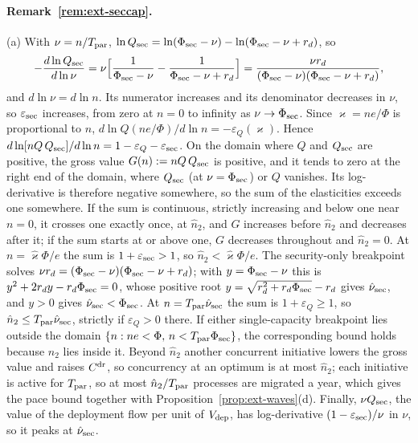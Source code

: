 \paragraph{Remark~\ref{rem:ext-seccap}.} (a) With $\nu=n/T_{\rm par}$, $\ln Q_{\rm sec}=\ln(\Phi_{\rm sec}-\nu)-\ln(\Phi_{\rm sec}-\nu+r_d)$, so
\[
-\frac{d\ln Q_{\rm sec}}{d\ln\nu}=\nu\Bigl[\frac1{\Phi_{\rm sec}-\nu}-\frac1{\Phi_{\rm sec}-\nu+r_d}\Bigr]=\frac{\nu r_d}{(\Phi_{\rm sec}-\nu)(\Phi_{\rm sec}-\nu+r_d)},
\]
and $d\ln\nu=d\ln n$. Its numerator increases and its denominator decreases in $\nu$, so $\varepsilon_{\rm sec}$ increases, from zero at $n=0$ to infinity as $\nu\to\Phi_{\rm sec}$. Since $\varkappa=ne/\Phi$ is proportional to $n$, $d\ln Q(ne/\Phi)/d\ln n=-\varepsilon_Q(\varkappa)$. Hence $d\ln[nQ\,Q_{\rm sec}]/d\ln n=1-\varepsilon_Q-\varepsilon_{\rm sec}$. On the domain where $Q$ and $Q_{\rm sec}$ are positive, the gross value $G(n):=nQ\,Q_{\rm sec}$ is positive, and it tends to zero at the right end of the domain, where $Q_{\rm sec}$ (at $\nu=\Phi_{\rm sec}$) or $Q$ vanishes. Its log-derivative is therefore negative somewhere, so the sum of the elasticities exceeds one somewhere. If the sum is continuous, strictly increasing and below one near $n=0$, it crosses one exactly once, at $\hat n_2$, and $G$ increases before $\hat n_2$ and decreases after it; if the sum starts at or above one, $G$ decreases throughout and $\hat n_2=0$. At $n=\hat\varkappa\Phi/e$ the sum is $1+\varepsilon_{\rm sec}>1$, so $\hat n_2<\hat\varkappa\Phi/e$. The security-only breakpoint solves $\nu r_d=(\Phi_{\rm sec}-\nu)(\Phi_{\rm sec}-\nu+r_d)$; with $y=\Phi_{\rm sec}-\nu$ this is $y^2+2r_dy-r_d\Phi_{\rm sec}=0$, whose positive root $y=\sqrt{r_d^2+r_d\Phi_{\rm sec}}-r_d$ gives $\hat\nu_{\rm sec}$, and $y>0$ gives $\hat\nu_{\rm sec}<\Phi_{\rm sec}$. At $n=T_{\rm par}\hat\nu_{\rm sec}$ the sum is $1+\varepsilon_Q\ge1$, so $\hat n_2\le T_{\rm par}\hat\nu_{\rm sec}$, strictly if $\varepsilon_Q>0$ there. If either single-capacity breakpoint lies outside the domain $\{n:ne<\Phi,\,n<T_{\rm par}\Phi_{\rm sec}\}$, the corresponding bound holds because $\hat n_2$ lies inside it. Beyond $\hat n_2$ another concurrent initiative lowers the gross value and raises $C^{\rm dr}$, so concurrency at an optimum is at most $\hat n_2$; each initiative is active for $T_{\rm par}$, so at most $\hat n_2/T_{\rm par}$ processes are migrated a year, which gives the pace bound together with Proposition~\ref{prop:ext-waves}(d). Finally, $\nu Q_{\rm sec}$, the value of the deployment flow per unit of $V_{\rm dep}$, has log-derivative $(1-\varepsilon_{\rm sec})/\nu$ in $\nu$, so it peaks at $\hat\nu_{\rm sec}$.

